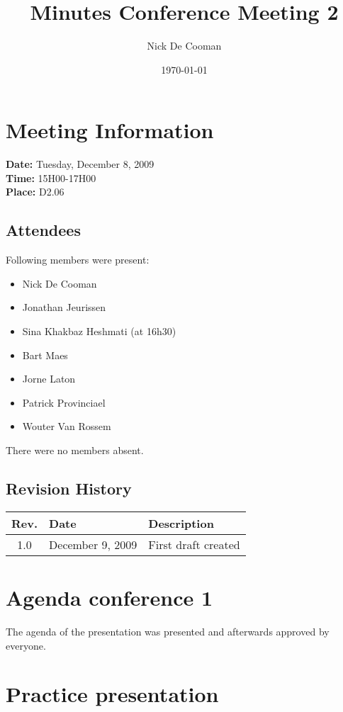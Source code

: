\documentclass[a4paper, 12pt]{article}
\begin{document}
\title{Minutes Conference Meeting 2}
\author{Nick De Cooman}
\date{\today}

\maketitle	
	\section{Meeting Information}
		\textbf{Date:} Tuesday, December 8, 2009\\
		\textbf{Time:} 15H00-17H00\\
		\textbf{Place:} D2.06\\
		
		\subsection{Attendees}
Following members were present:
			\begin{itemize}
				\item Nick De Cooman
				\item Jonathan Jeurissen
				\item Sina Khakbaz Heshmati (at 16h30)
				\item Bart Maes
				\item Jorne Laton
				\item Patrick Provinciael
				\item Wouter Van Rossem
			\end{itemize}
There were no members absent.
			
		\subsection{Revision History}
			\begin{tabular}{c | l | l }
				\textbf{Rev.} & \textbf{Date} & \textbf{Description} \\
				\hline
				1.0 & December 9, 2009 & First draft created \\

			\end{tabular}		

\section{Agenda conference 1}

The agenda of the presentation was presented and afterwards approved by everyone.

\section{Practice presentation}
\end{document}
